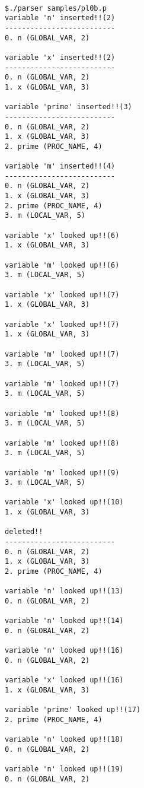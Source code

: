 \documentclass[uplatex]{jsarticle}
\begin{document}
\begin{lstlisting}[caption=pl0b.pに対するparserの実行,label=lst:ex3:result-pl0b.p]

$./parser samples/pl0b.p
variable 'n' inserted!!(2)
--------------------------
0. n (GLOBAL_VAR, 2)

variable 'x' inserted!!(2)
--------------------------
0. n (GLOBAL_VAR, 2)
1. x (GLOBAL_VAR, 3)

variable 'prime' inserted!!(3)
--------------------------
0. n (GLOBAL_VAR, 2)
1. x (GLOBAL_VAR, 3)
2. prime (PROC_NAME, 4)

variable 'm' inserted!!(4)
--------------------------
0. n (GLOBAL_VAR, 2)
1. x (GLOBAL_VAR, 3)
2. prime (PROC_NAME, 4)
3. m (LOCAL_VAR, 5)

variable 'x' looked up!!(6)
1. x (GLOBAL_VAR, 3)

variable 'm' looked up!!(6)
3. m (LOCAL_VAR, 5)

variable 'x' looked up!!(7)
1. x (GLOBAL_VAR, 3)

variable 'x' looked up!!(7)
1. x (GLOBAL_VAR, 3)

variable 'm' looked up!!(7)
3. m (LOCAL_VAR, 5)

variable 'm' looked up!!(7)
3. m (LOCAL_VAR, 5)

variable 'm' looked up!!(8)
3. m (LOCAL_VAR, 5)

variable 'm' looked up!!(8)
3. m (LOCAL_VAR, 5)

variable 'm' looked up!!(9)
3. m (LOCAL_VAR, 5)

variable 'x' looked up!!(10)
1. x (GLOBAL_VAR, 3)

deleted!!
--------------------------
0. n (GLOBAL_VAR, 2)
1. x (GLOBAL_VAR, 3)
2. prime (PROC_NAME, 4)

variable 'n' looked up!!(13)
0. n (GLOBAL_VAR, 2)

variable 'n' looked up!!(14)
0. n (GLOBAL_VAR, 2)

variable 'n' looked up!!(16)
0. n (GLOBAL_VAR, 2)

variable 'x' looked up!!(16)
1. x (GLOBAL_VAR, 3)

variable 'prime' looked up!!(17)
2. prime (PROC_NAME, 4)

variable 'n' looked up!!(18)
0. n (GLOBAL_VAR, 2)

variable 'n' looked up!!(19)
0. n (GLOBAL_VAR, 2)

\end{lstlisting}
\end{document}
